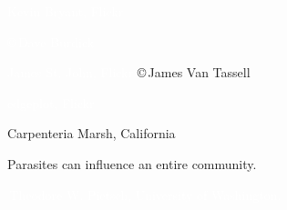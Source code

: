 \documentclass[t]{beamer}
\begin{document}
%
{
\begin{frame}[b]{}
\hfill\tiny\textcolor{white}{Kevin  Bryant, Flickr }
\end{frame}
}
%
{
\begin{frame}[t]

\vspace*{70mm}

\hfill \tiny \textcolor{white}{\copyright\,Dave Burdick}

\vfilll

\tiny \textcolor{white}{James St. John, Flickr } \hfill \copyright\,James Van Tassell
\end{frame}
}
%
{
\begin{frame}[b]{}
\hfill\tiny\textcolor{white}{edgeplot, Flickr }
\end{frame}
}
%
{
\begin{frame}[t]{Carpenteria Marsh, California}
\end{frame}
}
%
{
\begin{frame}[t]{Parasites can influence an entire community.}
\end{frame}
}
%
{
\begin{frame}[b]{}
\hfill\tiny\textcolor{white}{\textcopyright\,Theodore W. Pietsch, University of Washington.}
\end{frame}
}
%
\end{document}
